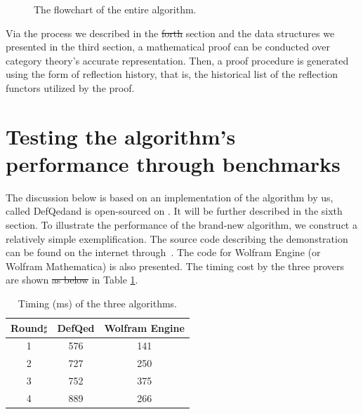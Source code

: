 \documentclass{aims}
\numberwithin{equation}{section}
\numberwithin{theorem}{section}	%
\numberwithin{axiom}{section}	%
\numberwithin{definition}{section}	%
\providecommand{\DIFadd}[1]{{\protect\color{blue}\uwave{#1}}} %
\providecommand{\DIFdel}[1]{{\protect\color{red}\sout{#1}}}                      %
\providecommand{\DIFaddbegin}{} %
\providecommand{\DIFaddend}{} %
\providecommand{\DIFdelbegin}{} %
\providecommand{\DIFdelend}{} %
\begin{document}
\begin{figure}[H]
		\caption{The flowchart of the entire algorithm.}
		\label{figure-3}
	\end{figure}

	Via the process we described in the \DIFdelbegin \DIFdel{forth }\DIFdelend \DIFaddbegin \DIFadd{fourth }\DIFaddend section and the data structures we presented in the third section, a mathematical proof can be conducted over category theory{'}s accurate representation. Then, a proof procedure is generated using the form of reflection history, that is, the historical list of the reflection functors utilized by the proof.

	\section{Testing the algorithm's performance through benchmarks}

	The discussion below is based on an implementation of the algorithm by us, called DefQed\DIFaddbegin \DIFadd{, }\DIFaddend and is open-sourced on \cite{Wang2022}. It will be further described in the sixth section. To illustrate the performance of the brand-new algorithm, we construct a relatively simple exemplification. The source code describing the demonstration can be found on the internet through~\cite{Wang2022-2}. The code for Wolfram Engine (or Wolfram Mathematica) is also presented. The timing cost by the three provers are shown \DIFdelbegin \DIFdel{as below }\DIFdelend in Table \ref{table-2}.
	\begin{table}[H]
		\centering
		\caption{Timing (ms) of the three algorithms.}

		\begin{tabular}{ccc}  
		\toprule
			Round$\sharp$ & DefQed & Wolfram Engine \\
			\midrule
			1 & 576 & 141  \\ 
			2 & 727 & 250  \\ 
			3 & 752 & 375  \\ 
			4 & 889 & 266  \\ 
			\bottomrule
		\end{tabular}
		\label{table-2}
	\end{table}
\end{document}
